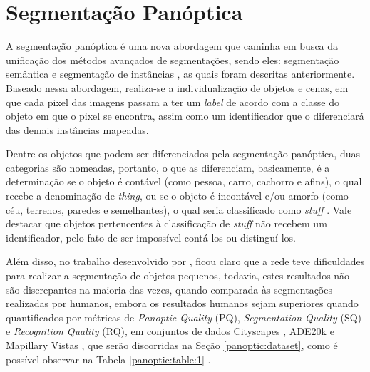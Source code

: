\newpage
\clearpage
\section{Segmentação Panóptica}
\label{panoptic:panoptic}
A segmentação panóptica \cite{Kirillov2019a} é uma nova abordagem que caminha em busca da unificação dos métodos avançados de segmentações, sendo eles: segmentação semântica e segmentação de instâncias \cite{He2020}, as quais foram descritas anteriormente. Baseado nessa abordagem, realiza-se a individualização de objetos e cenas, em que cada pixel das imagens passam a ter um \textit{label} de acordo com a classe do objeto em que o pixel se encontra, assim como um identificador que o diferenciará das demais instâncias mapeadas.

Dentre os objetos que podem ser diferenciados pela segmentação panóptica, duas categorias são nomeadas, portanto, o que as diferenciam, basicamente, é a determinação se o objeto é contável (como pessoa, carro, cachorro e afins), o qual  recebe a denominação de \textit{thing}, ou se o objeto é incontável e/ou amorfo (como céu, terrenos, paredes e semelhantes), o qual seria classificado como \textit{stuff} \cite{Kirillov2019a, Liu2019, Mohan2020}. Vale destacar que objetos pertencentes à classificação de \textit{stuff} não recebem um identificador, pelo fato de ser impossível contá-los ou distinguí-los.

Além disso, no trabalho desenvolvido por \cite{Kirillov2019a}, ficou claro que a rede teve dificuldades para realizar a segmentação de objetos pequenos, todavia, estes resultados não são discrepantes na maioria das vezes, quando comparada às segmentações realizadas por humanos, embora os resultados humanos sejam superiores quando quantificados por métricas de \textit{Panoptic Quality} (PQ), \textit{Segmentation Quality} (SQ) e \textit{Recognition Quality} (RQ), em conjuntos de dados Cityscapes \cite{Cordts2016}, ADE20k \cite{Zhou2016} e Mapillary Vistas \cite{Neuhold2017_ICCV}, que serão discorridas na Seção \ref{panoptic:dataset}, como é possível observar na Tabela \ref{panoptic:table:1} \cite{Kirillov2019a}.

